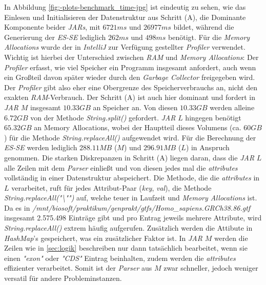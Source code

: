 \documentclass[12pt]{article}
\begin{document}
In Abbildung \ref{fig:-plots-benchmark_time-jpg} ist eindeutig zu sehen, wie das Einlesen und Initialisieren
der Datenstruktur aus Schritt (A), die Dominante Komponente beider \textit{JARs}, mit $6721ms$ und $26977ms$ bildet, während die Generierung der
\textit{ES-SE} lediglich $262ms$ und $498ms$ benötigt.
Für die \textit{Memory Allocations} wurde der in \textit{IntelliJ} zur Verfügung gestellter \textit{Profiler} verwendet.
Wichtig ist hierbei der Unterschied zwischen \textit{RAM} und \textit{Memory Allocations}:
Der \textit{Profiler} erfasst, wie viel Speicher ein Programm insgesamt anfordert,
auch wenn ein Großteil davon später wieder durch den \textit{Garbage Collector} freigegeben wird.
Der \textit{Profiler} gibt also eher eine Obergrenze des Speicherverbrauchs an, nicht den exakten \textit{RAM}-Verbrauch.
Der Schritt (A) ist auch hier dominant und fordert in \textit{JAR} $M$ insgesamt $10.33GB$ an Speicher an.
Von diesen $10.33GB$ werden alleine $6.72GB$ von der Methode \textit{String.split()} gefordert.
\textit{JAR} $L$ hingegen benötigt $65.32GB$ an Memory Allocations, wobei der Hauptteil
dieses Volumens (ca. $60GB$) für die Methode \textit{String.replaceAll()} aufgewendet wird.
Für die Berechnung der \textit{ES-SE} werden lediglich $288.11MB$ ($M$) und $296.91MB$ ($L$) in Anspruch genommen.
Die starken Diskrepanzen in Schritt (A) liegen daran, dass die \textit{JAR} $L$ alle Zeilen mit dem
\textit{Parser} einlie\ss t und von diesen jedes mal die \textit{attributes} vollständig in einer
Datenstruktur abspeichert. Die Methode, die die \textit{attributes} in $L$ verarbeitet, ruft für jedes Attribut-Paar
(\textit{key}, \textit{val}), die Methode \textit{String.replaceAll("\textbackslash "")} auf, welche teuer
in Laufzeit und \textit{Memory Allocations} ist.
Da es in \textit{/mnt/biosoft/praktikum/genprakt/gtfs/Homo\_sapiens.GRCh38.86.gtf} insgesamt 2.575.498 Einträge gibt
und pro Entrag jeweils mehrere Attribute, wird \textit{String.replaceAll()} extrem häufig aufgerufen.
Zusätzlich werden die Attibute in \textit{HashMap}'s gespeichert, was ein zusätzlicher Faktor ist.
In \textit{JAR} $M$ werden die Zeilen wie in \ref{sec:logik} beschreiben nur dann tatsächlich bearbeitet,
wenn sie einen \textit{"exon"} oder \textit{"CDS"} Eintrag beinhalten, zudem werden die \textit{attributes} effizienter
verarbeitet. Somit ist der \textit{Parser} aus $M$ zwar schneller, jedoch weniger versatil für andere Probleminstanzen.
\end{document}
